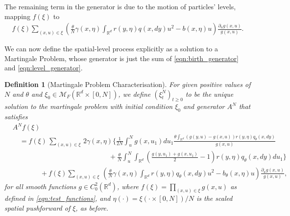 \documentclass[12pt]{article}
\newtheorem{definition}[theorem]{Definition}
\newcommand{\IR}{\mathbb R}
\newcommand{\lp}{\xi}              %
\begin{document}
The remaining term in the generator is due to the motion of particles' levels,
mapping $f(\xi)$ to
\begin{align} \label{eqn:level_generator}
    f(\lp)
    \sum_{(x, u) \in \lp}
    \left(
    \frac{\theta}{N}
        \gamma(x,\eta) \int_{\IR^d} r(y, \eta) q(x, dy) u^2
        -
        b(x, \eta)u
    \right)
    \frac{\partial_u g(x,u)}{g(x,u)} .
\end{align}



We can now define the spatial-level process
explicitly as a solution to a Martingale Problem,
whose generator is just the sum of
\eqref{eqn:birth_generator} and \eqref{eqn:level_generator}.

\begin{definition}[Martingale Problem Characterisation]
    \label{defn:lookdown_mgale}
For given positive values of $N$ and $\theta$
and $\lp_0 \in \mathcal{M}_F(\IR^d \times [0,N])$,
we define $(\lp^{N}_t)_{t \geq 0}$
to be the unique solution to the martingale problem
with initial condition $\lp_0$ and generator $A^{N}$ that satisfies
\begin{equation*}
\begin{split}
& A^{N}f(\lp ) \\
&\quad =
    f(\lp)
    \,\sum_{(x,u)\in \lp}\,
    2 \gamma(x, \eta)
    \Bigg\{ \frac{1}{2N} \int_u^N g(x,u_1) du_1
            \frac{
                \theta \int_{\IR^d}
                (g(y,u) - g(x,u))
                r(y, \eta) q_{\theta}(x,dy)
            }{ g(x,u) }
        \\
    &\qquad\qquad\qquad\qquad\qquad\qquad\qquad {} +
        \frac{\theta}{N} \int_u^N
        \int_{\IR^d}\left(
            \frac{ g(y,u_1) + g(x,u_1) }{ 2 } - 1
        \right)
        r(y, \eta) q_{\theta}(x,dy)
        du_1
    \Bigg\}\\
    &\qquad\qquad {} +
    f(\lp) \sum_{(x,u)\in\lp}\,
    \left(
        \frac{\theta}{N} \gamma(x,\eta) \int_{\IR^d} r(y, \eta) q_\theta(x, dy) u^2 -b_{\theta}(x,\eta)u
    \right)
    \frac{\partial_u g(x,u)}{g(x,u)}
    ,
\end{split}
\end{equation*}
for all smooth functions $g \in C^{2}_{0}(\IR^d)$,
where $f(\lp) = \prod_{(x, u) \in \lp} g(x, u)$ as defined in \eqref{eqn:test_functions},
and $\eta(\cdot) = \lp(\cdot \times [0, N]) / N$ is the scaled spatial pushforward of $\lp$,
as before.
\end{definition}
\end{document}
